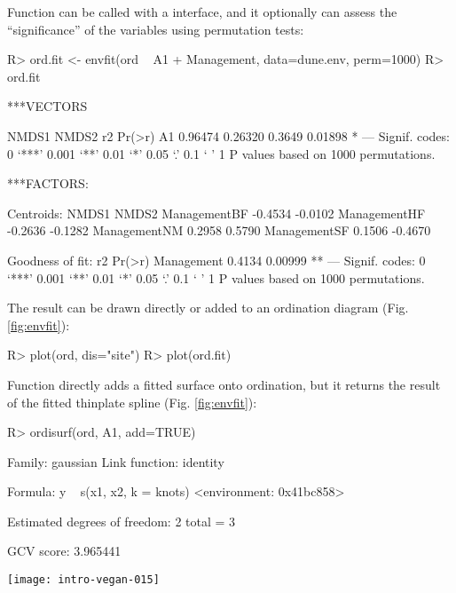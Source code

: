 \documentclass[article,nojss]{jss}
\begin{document}
Function  can be called with a 
interface, and it optionally can assess the ``significance'' of the
variables using permutation tests:
\begin{Schunk}
\begin{Sinput}
R> ord.fit <- envfit(ord ~ A1 + Management, data=dune.env, perm=1000)
R> ord.fit
\end{Sinput}
\begin{Soutput}
***VECTORS

     NMDS1   NMDS2     r2  Pr(>r)  
A1 0.96474 0.26320 0.3649 0.01898 *
---
Signif. codes:  0 ‘***’ 0.001 ‘**’ 0.01 ‘*’ 0.05 ‘.’ 0.1 ‘ ’ 1
P values based on 1000 permutations.

***FACTORS:

Centroids:
               NMDS1   NMDS2
ManagementBF -0.4534 -0.0102
ManagementHF -0.2636 -0.1282
ManagementNM  0.2958  0.5790
ManagementSF  0.1506 -0.4670

Goodness of fit:
               r2  Pr(>r)   
Management 0.4134 0.00999 **
---
Signif. codes:  0 ‘***’ 0.001 ‘**’ 0.01 ‘*’ 0.05 ‘.’ 0.1 ‘ ’ 1
P values based on 1000 permutations.
\end{Soutput}
\end{Schunk}
The result can be drawn directly or added to an ordination diagram
(Fig. \ref{fig:envfit}):
\begin{Schunk}
\begin{Sinput}
R> plot(ord, dis="site")
R> plot(ord.fit)
\end{Sinput}
\end{Schunk}

Function  directly adds a fitted surface onto
ordination, but it returns the result of the fitted thinplate spline
 (Fig. \ref{fig:envfit}):
\begin{Schunk}
\begin{Sinput}
R> ordisurf(ord, A1, add=TRUE)
\end{Sinput}
\begin{Soutput}
Family: gaussian 
Link function: identity 

Formula:
y ~ s(x1, x2, k = knots)
<environment: 0x41bc858>

Estimated degrees of freedom:
2  total = 3 

GCV score: 3.965441
\end{Soutput}
\end{Schunk}
\begin{SCfigure}
\texttt{[image: intro-vegan-015]}
\caption{Fitted vector and smooth surface for the thickness of A1
  horizon (, in cm), and centroids of Management levels.}
\label{fig:envfit}
\end{SCfigure}
\end{document}
